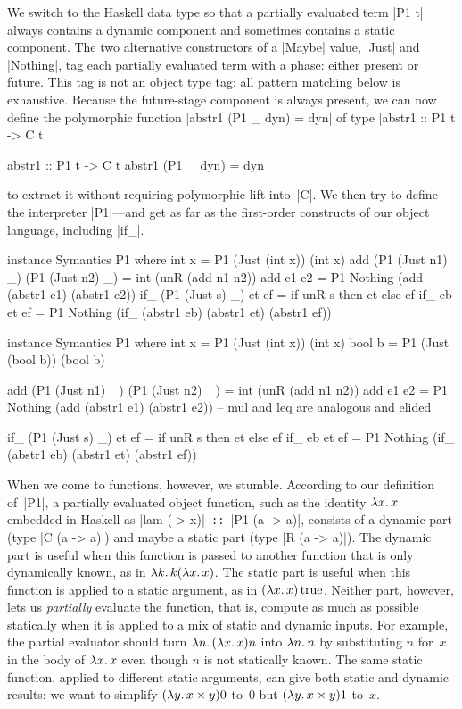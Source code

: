 We switch to the Haskell data type
\ifshort {} \else {} \fi
so that a partially evaluated term |P1 t| always contains a dynamic
component and sometimes contains a static component.  The two
alternative constructors of a |Maybe| value, |Just| and |Nothing|,
tag each partially evaluated term with a phase: either present or
future.  This tag is not an object type tag: all pattern matching below
is exhaustive.  Because the future-stage component is always present, we
can now define the polymorphic function
\ifshort
|abstr1 (P1 _ dyn) = dyn| of type
|abstr1 :: P1 t -> C t|
\else
\begin{code}
abstr1 :: P1 t -> C t
abstr1 (P1 _ dyn) = dyn
\end{code}
\fi
to extract it without requiring polymorphic lift into~|C|.  We then try
to define the interpreter |P1|---and get as far as the first-order
constructs of our object language, including |if_|.
\ifshort
\vspace*{-0.7em}
\begin{code3}
instance Symantics P1 where
  int x = P1 (Just (int x)) (int x)
  add (P1 (Just n1) _) (P1 (Just n2) _) = int (unR (add n1 n2))
  add e1 e2 = P1 Nothing (add (abstr1 e1) (abstr1 e2))
  if_ (P1 (Just s) _) et ef = if unR s then et else ef
  if_ eb et ef = P1 Nothing (if_ (abstr1 eb) (abstr1 et) (abstr1 ef))
\end{code3}
\vspace*{-0.7em}
\else
\begin{code}
instance Symantics P1 where
  int  x = P1 (Just (int  x)) (int  x)
  bool b = P1 (Just (bool b)) (bool b)

  add (P1 (Just n1) _) (P1 (Just n2) _) = int (unR (add n1 n2))
  add e1 e2 = P1 Nothing (add (abstr1 e1) (abstr1 e2))
  -- mul and leq are analogous and elided

  if_ (P1 (Just s) _) et ef = if unR s then et else ef
  if_ eb et ef = P1 Nothing
                    (if_ (abstr1 eb) (abstr1 et) (abstr1 ef))
\end{code}
\fi
When we come to functions, however, we stumble.  According to our
definition of~|P1|, a partially evaluated object function, such as the
identity $\mathopen{\lambda\mathord{x}.\,}x$ embedded in Haskell as |lam (\x -> x)|\texttt{ ::
}|P1 (a -> a)|, consists of a dynamic part (type |C (a -> a)|) and
maybe a static part (type |R (a -> a)|).  The dynamic part is useful
when this function is passed to another function that is only
dynamically known, as in $\mathopen{\lambda\mathord{k}.\,}k(\mathopen{\lambda\mathord{x}.\,}x)$.  The static part is
useful when this function is applied to a static argument, as in
$(\mathopen{\lambda\mathord{x}.\,}x)\mathinner{\mathrm{true}}$.  Neither part, however, lets us \emph{partially}
evaluate the function, that is, compute as much as possible statically
when it is applied to a mix of static and dynamic inputs.  For example,
the partial evaluator should turn $\mathopen{\lambda\mathord{n}.\,}(\mathopen{\lambda\mathord{x}.\,}x)n$ into $\mathopen{\lambda\mathord{n}.\,}n$
by substituting $n$ for~$x$ in the body of $\mathopen{\lambda\mathord{x}.\,}x$ even though $n$ is
not statically known.  The same static function, applied to
different static arguments, can give both static and dynamic results: we
want to simplify $(\mathopen{\lambda\mathord{y}.\,}x\times y)0$ to~$0$ but $(\mathopen{\lambda\mathord{y}.\,}x\times y)1$
to~$x$.

